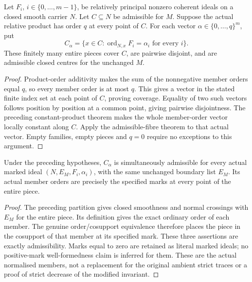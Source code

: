 \begin{theorem}
\label{hir:sharp-actual-finite-member-order-centre-partition}
Let $F_i$, $i\in\{0,\ldots,m-1\}$, be relatively principal nonzero
coherent ideals on a closed smooth carrier $N$. Let $C\subseteq N$ be
admissible for $M$. Suppose the actual relative product has order $q$
at every point of $C$. For each vector
$\alpha\in\{0,\ldots,q\}^{m}$, put
\[
 C_\alpha=\{x\in C:\operatorname{ord}_{N,x}F_i=\alpha_i
                      \text{ for every }i\}.
\]
These finitely many entire pieces cover $C$, are pairwise disjoint,
and are admissible closed centres for the unchanged $M$.
\leanok
\end{theorem}
\begin{proof}
Product-order additivity makes the sum of the nonnegative member orders
equal $q$, so every member order is at most $q$. This gives a vector in
the stated finite index set at each point of $C$, proving coverage.
Equality of two such vectors follows position by position at a common
point, giving pairwise disjointness. The preceding constant-product
theorem makes the whole member-order vector locally constant along $C$.
Apply the admissible-fibre theorem to that actual vector. Empty families,
empty pieces and $q=0$ require no exceptions to this argument.
\end{proof}

\begin{theorem}
\label{hir:sharp-actual-finite-member-order-weight-admissibility}
Under the preceding hypotheses, $C_\alpha$ is simultaneously admissible
for every actual marked ideal $(N,E_M,F_i,\alpha_i)$, with the same
unchanged boundary list $E_M$. Its actual member orders are precisely
the specified marks at every point of the entire piece.
\leanok
\end{theorem}
\begin{proof}
The preceding partition gives closed smoothness and normal crossings
with $E_M$ for the entire piece. Its definition gives the exact ordinary
order of each member. The genuine order/cosupport equivalence therefore
places the piece in the cosupport of that member at its specified mark.
These three assertions are exactly admissibility. Marks equal to zero
are retained as literal marked ideals; no positive-mark well-formedness
claim is inferred for them. These are the actual normalised members,
not a replacement for the original ambient strict traces or a proof of
strict decrease of the modified invariant.
\end{proof}
